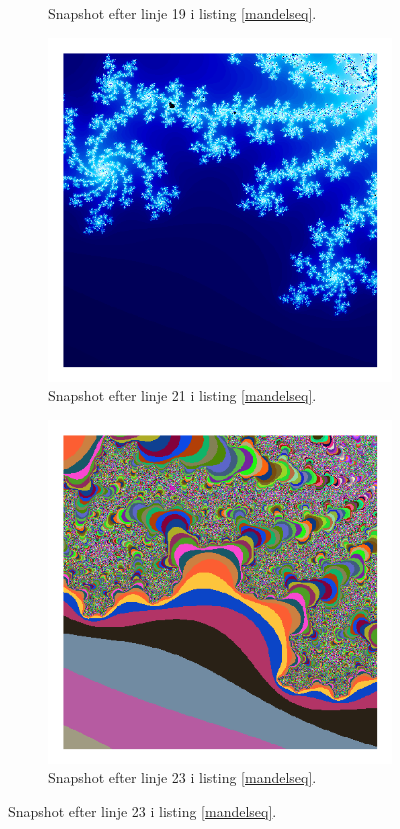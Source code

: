 \begin{figure}
\begin{subfigure}[b]{0.3\textwidth}
        \caption{ Snapshot efter linje 19 i listing \ref{mandelseq}.}
    \end{subfigure}
    \begin{subfigure}[b]{0.3\textwidth}
        \centering
        \includegraphics[width=\textwidth]{pictures/M9.png}
        \caption{ Snapshot efter linje 21 i listing \ref{mandelseq}.}
    \end{subfigure}

    \begin{subfigure}[b]{0.3\textwidth}
        \centering
        \includegraphics[width=\textwidth]{pictures/M10.png}
        \caption{ Snapshot efter linje 23 i listing \ref{mandelseq}.}
    \end{subfigure}
\end{figure}
